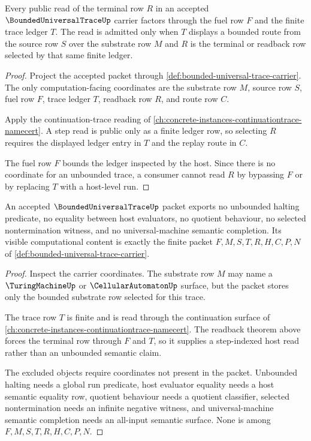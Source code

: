 \begin{theorem}
\label{thm:bounded-universal-trace-step-index-readback}
Every public read of the terminal row $R$ in an accepted $\BoundedUniversalTraceUp$ carrier factors through the fuel row $F$ and the finite trace ledger $T$. The read is admitted only when $T$ displays a bounded route from the source row $S$ over the substrate row $M$ and $R$ is the terminal or readback row selected by that same finite ledger.
\end{theorem}
\begin{proof}
Project the accepted packet through \autoref{def:bounded-universal-trace-carrier}. The only computation-facing coordinates are the substrate row $M$, source row $S$, fuel row $F$, trace ledger $T$, readback row $R$, and route row $C$.

Apply the continuation-trace reading of \autoref{ch:concrete-instances-continuationtrace-namecert}. A step read is public only as a finite ledger row, so selecting $R$ requires the displayed ledger entry in $T$ and the replay route in $C$.

The fuel row $F$ bounds the ledger inspected by the host. Since there is no coordinate for an unbounded trace, a consumer cannot read $R$ by bypassing $F$ or by replacing $T$ with a host-level run.
\end{proof}

\begin{theorem}
\label{thm:bounded-universal-trace-non-escape}
An accepted $\BoundedUniversalTraceUp$ packet exports no unbounded halting predicate, no equality between host evaluators, no quotient behaviour, no selected nontermination witness, and no universal-machine semantic completion. Its visible computational content is exactly the finite packet $F,M,S,T,R,H,C,P,N$ of \autoref{def:bounded-universal-trace-carrier}.
\end{theorem}
\begin{proof}
Inspect the carrier coordinates. The substrate row $M$ may name a $\TuringMachineUp$ or $\CellularAutomatonUp$ surface, but the packet stores only the bounded substrate row selected for this trace.

The trace row $T$ is finite and is read through the continuation surface of \autoref{ch:concrete-instances-continuationtrace-namecert}. The readback theorem above forces the terminal row through $F$ and $T$, so it supplies a step-indexed host read rather than an unbounded semantic claim.

The excluded objects require coordinates not present in the packet. Unbounded halting needs a global run predicate, host evaluator equality needs a host semantic equality row, quotient behaviour needs a quotient classifier, selected nontermination needs an infinite negative witness, and universal-machine semantic completion needs an all-input semantic surface. None is among $F,M,S,T,R,H,C,P,N$.
\end{proof}

